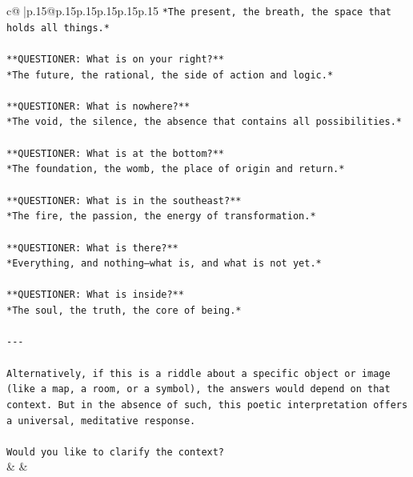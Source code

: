 \documentclass{article}
\begin{document}
{\begin{supertabular}{c@{$\;$}|p{.15\linewidth}@{}p{.15\linewidth}p{.15\linewidth}p{.15\linewidth}p{.15\linewidth}p{.15\linewidth}}
{{{\texttt{*The present, the breath, the space that holds all things.*} \\
\\ 
\texttt{**QUESTIONER: What is on your right?**  } \\
\texttt{*The future, the rational, the side of action and logic.*} \\
\\ 
\texttt{**QUESTIONER: What is nowhere?**  } \\
\texttt{*The void, the silence, the absence that contains all possibilities.*} \\
\\ 
\texttt{**QUESTIONER: What is at the bottom?**  } \\
\texttt{*The foundation, the womb, the place of origin and return.*} \\
\\ 
\texttt{**QUESTIONER: What is in the southeast?**  } \\
\texttt{*The fire, the passion, the energy of transformation.*} \\
\\ 
\texttt{**QUESTIONER: What is there?**  } \\
\texttt{*Everything, and nothing—what is, and what is not yet.*} \\
\\ 
\texttt{**QUESTIONER: What is inside?**  } \\
\texttt{*The soul, the truth, the core of being.*} \\
\\ 
\texttt{{-}{-}{-}} \\
\\ 
\texttt{Alternatively, if this is a riddle about a specific object or image (like a map, a room, or a symbol), the answers would depend on that context. But in the absence of such, this poetic interpretation offers a universal, meditative response.} \\
\\ 
\texttt{Would you like to clarify the context?} \\
            }
        }
    }
    & & \\ \\


\end{supertabular}}
\end{document}
